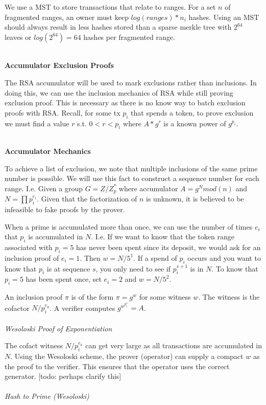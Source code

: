 \documentclass[12pt]{article}
\begin{document}
We use a MST to store transactions that relate to ranges. For a set $n$ of fragmented ranges, an owner must keep $log(ranges) * n_i$ hashes. Using an MST should always result in less hashes stored than a sparse merkle tree with $2^{64}$ leaves or $log(2^{64}) =64$ hashes per fragmented range.
\\
\\
\centerline{\textbf{Accumulator Exclusion Proofs}}

The RSA accumulator will be used to mark exclusions rather than inclusions. In doing this, we can use the inclusion mechanics of RSA while still proving exclusion proof. This is necessary as there is no know way to batch exclusion proofs with RSA. Recall, for some tx $p_i$ that spends a token, to prove exclusion we must find a value $r$ s.t. $0 < r < p_i$ where $A * g^r$ is a known power of $g^{p_i}$.
\\
\\
\centerline{\textbf{Accumulator Mechanics}}

To achieve a list of exclusion, we note that multiple inclusions of the same prime number is possible. We will use this fact to construct a sequence number for each range. I.e. Given a group $G = Z / Z_p^*$ where accumulator $A = g^N mod(n)$ and $N=\prod{p_i^{e_i}}$. Given that the factorization of $n$ is unknown, it is believed to be infeasible to fake proofs by the prover.

When a prime is accumulated more than once, we can use the number of times $e_i$ that $p_i$ is accumulated in $N$. I.e. If we want to know that the token range associated with $p_i = 5$ has never been spent since its deposit, we would ask for an inclusion proof of $e_i = 1$. Then $w = N/5^1$. If a spend of $p_i$ occurs and you want to know that $p_i$ is at sequence $s$, you only need to see if $p_i^{s+1}$ is in $N$. To know that $p_i = 5$ has been spent once, set $e_i = 2$ and $w = N/5^2$. 

An inclusion proof $\pi$ is of the form $\pi = g^w$ for some witness $w$. The witness is the cofactor $N/p_i^{e_k}$. A verifier computes $g^{w^{p_i^{e_i}}} = A$.
\\
\\
\textit{Wesoloski Proof of Exponentiation}

The cofact witness $N/p_i^{e_k}$ can get very large as all transactions are accumulated in $N$. Using the Wesoloski scheme, the prover (operator) can supply a compact $w$ as the proof to the verifier. This ensures that the operator uses the correct generator. [todo: perhaps clarify this]
\\
\\
\textit{Hash to Prime (Wesoloski)}
\end{document}

